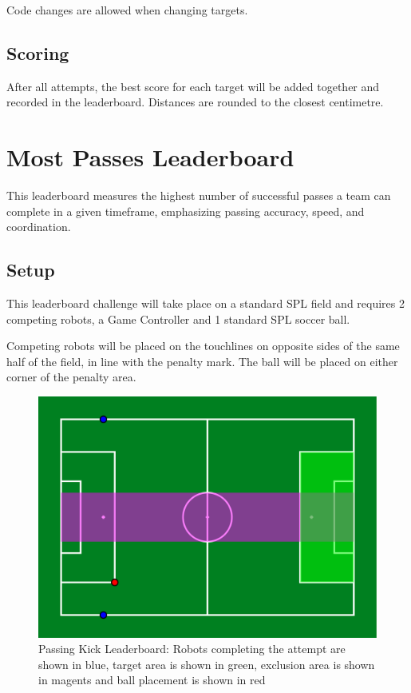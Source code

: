 Code changes are allowed when changing targets.
\subsection{Scoring}
After all attempts, the best score for each target will be added together and recorded in the leaderboard.
Distances are rounded to the closest centimetre.

\section{Most Passes Leaderboard}
This leaderboard measures the highest number of successful passes a team can
complete in a given timeframe, emphasizing passing accuracy, speed, and coordination.

\subsection{Setup}
This leaderboard challenge will take place on a standard SPL field and requires 2 competing robots,
a Game Controller and 1 standard SPL soccer ball.

Competing robots will be placed on the touchlines on opposite sides of the same half of the field,
in line with the penalty mark. The ball will be placed on either corner of the penalty area.

\begin{figure}[t]
    \centerline{\includegraphics[width=\columnwidth]{figs/passing_leaderboard.pdf}}
    \caption{Passing Kick Leaderboard: Robots completing the attempt are shown in blue, target area is shown in green, exclusion area is shown in magents and ball placement is shown in red}
    \label{fig:passing_leaderboard}
\end{figure}
